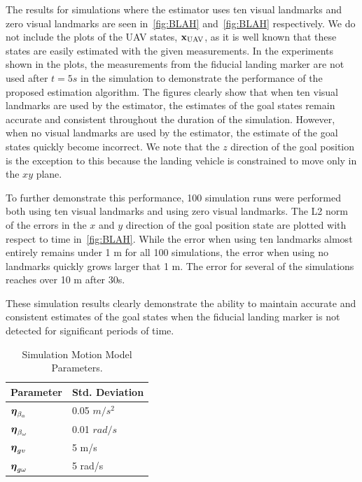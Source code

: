 The results for simulations where the estimator uses ten visual landmarks and
zero visual landmarks are seen in~\ref{fig:BLAH} and~\ref{fig:BLAH}
respectively. We do not include the plots of the UAV states,
$\boldsymbol{\mathrm{x}}_{\text{UAV}}$, as it is well known that these states are easily
estimated with the given measurements. In the experiments shown in the plots,
the measurements from the fiducial landing marker are not used after $t = 5 s$
in the simulation to demonstrate the performance of the proposed estimation
algorithm. The figures clearly show that when ten visual landmarks are used by
the estimator, the estimates of the goal states remain accurate and consistent
throughout the duration of the simulation. However, when no visual landmarks are
used by the estimator, the estimate of the goal states quickly become incorrect.
We note that the $z$ direction of the goal position is the exception to this
because the landing vehicle is constrained to move only in the $xy$ plane.

To further demonstrate this performance, 100 simulation runs were performed
both using ten visual landmarks and using zero visual landmarks. The L2 norm of
the errors in the $x$ and $y$ direction of the goal position state are plotted
with respect to time in~\ref{fig:BLAH}. While the error when using ten landmarks
almost entirely remains under 1 m for all 100 simulations, the error when using
no landmarks quickly grows larger that 1 m. The error for several of the
simulations reaches over 10 m after 30s.

These simulation results clearly demonstrate the ability to maintain accurate
and consistent estimates of the goal states when the fiducial landing marker is
not detected for significant periods of time.


\begin{table}[h!]
  \begin{center}
    \caption{Simulation Motion Model Parameters.}
    \label{tab:sim_process_noises}
    \begin{tabular}{l|l}
      \textbf{Parameter} & \textbf{Std. Deviation} \\
      \hline
      $\boldsymbol{\mathrm{\eta}}_{\beta_a}$ & 0.05 $m/s^2$ \\
      $\boldsymbol{\mathrm{\eta}}_{\beta_\omega}$ & 0.01 $rad/s$ \\
      $\boldsymbol{\mathrm{\eta}}_{gv}$ & 5 m/s \\
      $\boldsymbol{\mathrm{\eta}}_{g\omega}$ & 5 rad/s \\
    \end{tabular}
  \end{center}
\end{table}

